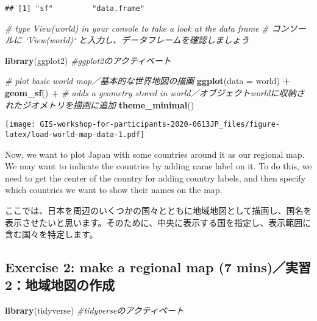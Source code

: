 \documentclass[
  xelatex,ja=standard]{bxjsarticle}
\newenvironment{Shaded}{\begin{snugshade}}{\end{snugshade}}
\newcommand{\CommentTok}[1]{\textcolor[rgb]{0.56,0.35,0.01}{\textit{#1}}}
\newcommand{\DataTypeTok}[1]{\textcolor[rgb]{0.13,0.29,0.53}{#1}}
\newcommand{\KeywordTok}[1]{\textcolor[rgb]{0.13,0.29,0.53}{\textbf{#1}}}
\newcommand{\NormalTok}[1]{#1}
\newcommand{\OperatorTok}[1]{\textcolor[rgb]{0.81,0.36,0.00}{\textbf{#1}}}
\newcommand{\StringTok}[1]{\textcolor[rgb]{0.31,0.60,0.02}{#1}}
\begin{document}
\begin{verbatim}
## [1] "sf"         "data.frame"
\end{verbatim}

\begin{Shaded}
\begin{Highlighting}[]
\CommentTok{# type View(world) in your console to take a look at the data frame}
\CommentTok{# コンソールに `View(world)` と入力し、データフレームを確認しましょう}

\KeywordTok{library}\NormalTok{(ggplot2) }\CommentTok{#ggplot2のアクティベート}

\CommentTok{# plot basic world map／基本的な世界地図の描画 }
\KeywordTok{ggplot}\NormalTok{(}\DataTypeTok{data =}\NormalTok{ world) }\OperatorTok{+}
\StringTok{  }\KeywordTok{geom_sf}\NormalTok{() }\OperatorTok{+}\StringTok{ }\CommentTok{# adds a geometry stored in world／オブジェクトworldに収納されたジオメトリを描画に追加}
\StringTok{  }\KeywordTok{theme_minimal}\NormalTok{()}
\end{Highlighting}
\end{Shaded}

\texttt{[image: GIS-workshop-for-participants-2020-0613JP\_files/figure-latex/load-world-map-data-1.pdf]}

Now, we want to plot Japan with some countries around it as our regional
map. We may want to indicate the countries by adding name label on it.
To do this, we need to get the center of the country for adding country
labels, and then specify which countries we want to show their names on
the map.

ここでは、日本を周辺のいくつかの国々とともに地域地図として描画し、国名を表示させたいと思います。そのために、中央に表示する国を指定し、表示範囲に含む国々を特定します。

\hypertarget{exercise-2-make-a-regional-map-7-minsux5b9fux7fd22ux5730ux57dfux5730ux56f3ux306eux4f5cux6210}{%
\subsection{Exercise 2: make a regional map (7
mins)／実習2：地域地図の作成}\label{exercise-2-make-a-regional-map-7-minsux5b9fux7fd22ux5730ux57dfux5730ux56f3ux306eux4f5cux6210}}

\begin{Shaded}
\begin{Highlighting}[]
\KeywordTok{library}\NormalTok{(tidyverse) }\CommentTok{#tidyverseのアクティベート}
\end{Highlighting}
\end{Shaded}
\end{document}
